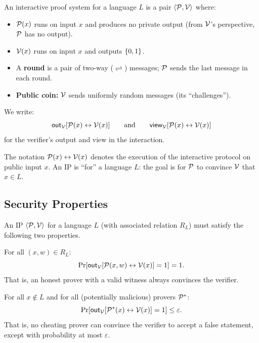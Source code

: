 \documentclass[11pt]{article}
\begin{document}
\begin{tcolorbox}[colback=blue!5!white, colframe=blue!60!black, title={Definition: Interactive Proof System}]
  An interactive proof system for a language $L$ is a pair $\langle \mathcal{P}, \mathcal{V} \rangle$
  where:
  \begin{itemize}
    \item $\mathcal{P}(x)$ runs on input $x$ and produces no private output (from $\mathcal{V}$'s
          perspective, $\mathcal{P}$ has no output).
    \item $\mathcal{V}(x)$ runs on input $x$ and outputs $\{0,1\}$.
    \item A \textbf{round} is a pair of two-way ($\rightleftharpoons$) messages; $\mathcal{P}$ sends the last message in each round.
    \item \textbf{Public coin:} $\mathcal{V}$ sends uniformly random messages (its ``challenges'').
  \end{itemize}

  We write:
  \[
    \mathsf{out}_{\mathcal{V}}[\mathcal{P}(x) \leftrightarrow \mathcal{V}(x)]
    \qquad \text{and} \qquad
    \mathsf{view}_{\mathcal{V}}[\mathcal{P}(x) \leftrightarrow \mathcal{V}(x)]
  \]
  for the verifier's output and view in the interaction.
\end{tcolorbox}

\medskip
The notation $\mathcal{P}(x) \leftrightarrow \mathcal{V}(x)$ denotes the execution of the interactive
protocol on public input $x$. An IP is ``for'' a language $L$: the goal is for $\mathcal{P}$ to
convince $\mathcal{V}$ that $x \in L$.

\subsection{Security Properties}

An IP $\langle \mathcal{P}, \mathcal{V} \rangle$ for a language $L$ (with associated relation $R_L$)
must satisfy the following two properties.

\begin{tcolorbox}[colback=green!8, colframe=green!50!black, title={Completeness}]
  For all $(x, w) \in R_L$:
  \[
    \Pr\!\left[\mathsf{out}_{\mathcal{V}}\!\left[\mathcal{P}(x, w) \leftrightarrow \mathcal{V}(x)\right] = 1\right] = 1.
  \]
  That is, an honest prover with a valid witness always convinces the verifier.
\end{tcolorbox}

\begin{tcolorbox}[colback=red!8, colframe=red!50!black, title={$\varepsilon$-Soundness}]
  For all $x \notin L$ and for all (potentially malicious) provers $\mathcal{P}^*$:
  \[
    \Pr\!\left[\mathsf{out}_{\mathcal{V}}\!\left[\mathcal{P}^*(x) \leftrightarrow \mathcal{V}(x)\right] = 1\right] \leq \varepsilon.
  \]
  That is, no cheating prover can convince the verifier to accept a false statement, except with
  probability at most $\varepsilon$.
\end{tcolorbox}
\end{document}

